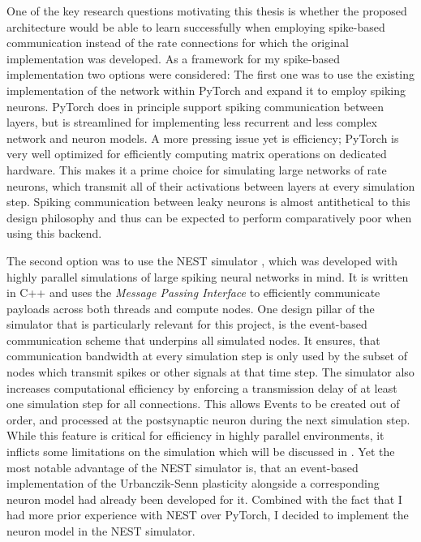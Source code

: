 One of the key research questions motivating this thesis is whether the proposed architecture would be able to learn
successfully when employing spike-based communication instead of the rate connections for which the original
implementation was developed. As a framework for my spike-based implementation two options were considered: The first
one was to use the existing implementation of the network within PyTorch  and expand it to
employ spiking neurons. PyTorch does in principle support spiking communication between layers, but is streamlined for
implementing less recurrent and less complex network and neuron models. A more pressing issue yet is efficiency; PyTorch
is very well optimized for efficiently computing matrix operations on dedicated hardware. This makes it a prime choice
for simulating large networks of rate neurons, which transmit all of their activations between layers at every
simulation step. Spiking communication between leaky neurons is almost antithetical to this design philosophy and thus
can be expected to perform comparatively poor when using this backend.

The second option was to use the NEST simulator \citeme, which was developed with highly parallel simulations of large
spiking neural networks in mind. It is written in C++ and uses the \textit{Message Passing Interface} to efficiently
communicate payloads across both threads and compute nodes. One design pillar of the simulator that is particularly 
relevant for this project, is the event-based communication scheme that underpins all simulated nodes. It ensures, that
communication bandwidth at every simulation step is only used by the subset of nodes which transmit spikes or other
signals at that time step. The simulator also increases computational efficiency by enforcing a transmission delay of 
at least one simulation step for all connections. This allows Events to be created out of order, and processed at the
postsynaptic neuron during the next simulation step. While this feature is critical for efficiency in highly parallel
environments, it inflicts some limitations on the simulation which will be discussed in . Yet the 
most notable advantage of the NEST simulator is, that an event-based implementation of the Urbanczik-Senn plasticity
alongside a corresponding neuron model had already been developed for it. Combined with the fact that I had more prior
experience with NEST over PyTorch, I decided to implement the neuron model in the NEST simulator.

